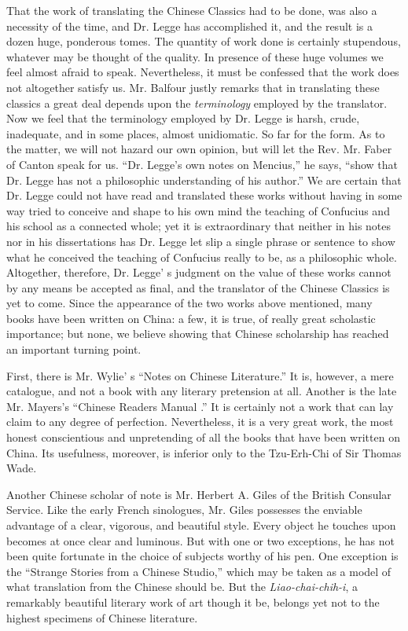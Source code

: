 That the work of translating the Chinese Classics had to be done,
was also a necessity of the time, and Dr. Legge has accomplished it,
and the result is a dozen huge, ponderous tomes.
The quantity of work done is certainly stupendous, whatever may be thought of the quality.
In presence of these huge volumes we feel almost afraid to speak.
Nevertheless, it must be confessed that the work does not altogether satisfy us.
Mr. Balfour justly remarks that in translating these classics a great deal depends upon
the \emph{terminology} employed by the translator.
Now we feel that the terminology employed by Dr. Legge is harsh, crude, inadequate, and in some places, almost unidiomatic.
So far for the form.
As to the matter, we will not hazard our own opinion,
but will let the Rev. Mr. Faber of Canton speak for us.
``Dr. Legge's own notes on Mencius,'' he says,
``show that Dr. Legge has not a philosophic understanding of his author.''
We are certain that Dr. Legge could not have read and translated these works
without having in some way tried to conceive and shape to his own mind
the teaching of Confucius and his school as a connected whole;
yet it is extraordinary that neither in his notes nor in his dissertations
has Dr. Legge let slip a single phrase or sentence to show
what he conceived the teaching of Confucius really to be, as a philosophic whole.
Altogether, therefore, Dr. Legge' s judgment on the value of these works
cannot by any means be accepted as final,
and the translator of the Chinese Classics is yet to come.
Since the appearance of the two works above mentioned, many books have been written on China:
a few, it is true, of really great scholastic importance;
but none, we believe showing that Chinese scholarship has reached an important turning point.

First, there is Mr. Wylie' s ``Notes on Chinese Literature.''
It is, however, a mere catalogue, and not a book with any literary pretension at all.
Another is the late Mr. Mayers's ``Chinese Readers Manual .''
It is certainly not a work that can lay claim to any degree of perfection.
Nevertheless, it is a very great work, the most honest conscientious and unpretending of all the books that have been written on China.
Its usefulness, moreover, is inferior only to the Tzu-Erh-Chi of Sir Thomas Wade.

Another Chinese scholar of note is Mr. Herbert A. Giles of the British Consular Service.
Like the early French sinologues,
Mr. Giles possesses the enviable advantage of a clear, vigorous, and beautiful style.
Every object he touches upon becomes at once clear and luminous.
But with one or two exceptions,
he has not been quite fortunate in the choice of subjects worthy of his pen.
One exception is the ``Strange Stories from a Chinese Studio,''
which may be taken as a model of what translation from the Chinese should be.
But the \emph{Liao-chai-chih-i}, a remarkably beautiful literary work of art though it be,
belongs yet not to the highest specimens of Chinese literature.

